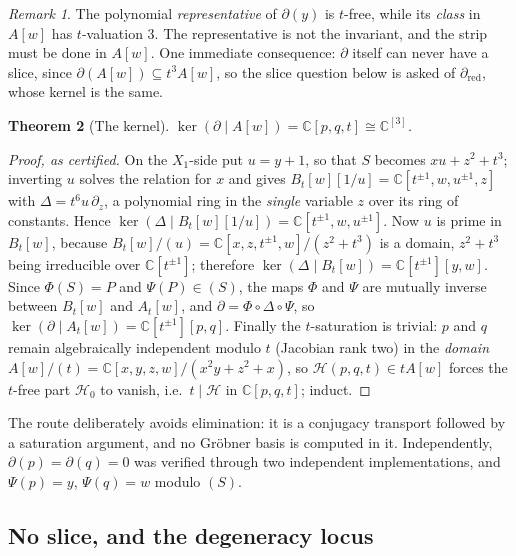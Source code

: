 \documentclass[11pt]{article}
\newtheorem{theorem}{Theorem}[section]
\theoremstyle{definition}
\theoremstyle{remark}
\newtheorem{remark}[theorem]{Remark}
\newcommand{\C}{\mathbb{C}}
\begin{document}
\begin{remark}\label{rem:representative}
The polynomial \emph{representative} of $\partial(y)$ is $t$-free, while its
\emph{class} in $A[w]$ has $t$-valuation $3$. The representative is not the
invariant, and the strip must be done in $A[w]$. One immediate consequence:
$\partial$ itself can never have a slice, since $\partial(A[w])\subseteq
t^3A[w]$, so the slice question below is asked of
$\partial_{\mathrm{red}}$, whose kernel is the same.
\end{remark}

\begin{theorem}[The kernel]\label{thm:kernel}
$\ker(\partial\mid A[w])=\C[p,q,t]\cong\C^{[3]}$.
\end{theorem}

\begin{proof}[Proof, as certified]
On the $X_1$-side put $u=y+1$, so that $S$ becomes $xu+z^2+t^3$; inverting $u$
solves the relation for $x$ and gives $B_t[w][1/u]=\C[t^{\pm1},w,u^{\pm1},z]$
with $\Delta=t^6u\,\partial_z$, a polynomial ring in the \emph{single}
variable $z$ over its ring of constants. Hence $\ker(\Delta\mid
B_t[w][1/u])=\C[t^{\pm1},w,u^{\pm1}]$. Now $u$ is prime in $B_t[w]$, because
$B_t[w]/(u)=\C[x,z,t^{\pm1},w]/(z^2+t^3)$ is a domain, $z^2+t^3$ being
irreducible over $\C[t^{\pm1}]$; therefore $\ker(\Delta\mid B_t[w])=
\C[t^{\pm1}][y,w]$. Since $\Phi(S)=P$ and $\Psi(P)\in(S)$, the maps $\Phi$ and
$\Psi$ are mutually inverse between $B_t[w]$ and $A_t[w]$, and
$\partial=\Phi\circ\Delta\circ\Psi$, so $\ker(\partial\mid A_t[w])=
\C[t^{\pm1}][p,q]$. Finally the $t$-saturation is trivial: $p$ and $q$ remain
algebraically independent modulo $t$ (Jacobian rank two) in the \emph{domain}
$A[w]/(t)=\C[x,y,z,w]/(x^2y+z^2+x)$, so $\mathcal H(p,q,t)\in tA[w]$ forces the
$t$-free part $\mathcal H_0$ to vanish, i.e.\ $t\mid \mathcal H$ in $\C[p,q,t]$;
induct.
\end{proof}

The route deliberately avoids elimination: it is a conjugacy transport
followed by a saturation argument, and no Gr\"obner basis is computed in it.
Independently, $\partial(p)=\partial(q)=0$ was verified through two
independent implementations, and $\Psi(p)=y$, $\Psi(q)=w$ modulo $(S)$.

\subsection{No slice, and the degeneracy locus}
\end{document}
